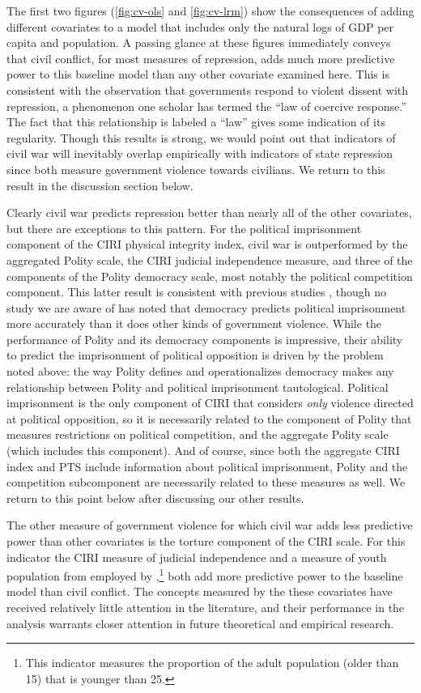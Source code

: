 \documentclass[12pt]{article}
\begin{document}
The first two figures (\ref{fig:cv-ols} and \ref{fig:cv-lrm}) show the consequences of adding different covariates to a model that includes only the natural logs of GDP per capita and population. A passing glance at these figures immediately conveys that civil conflict, for most measures of repression, adds much more predictive power to this baseline model than any other covariate examined here. This is consistent with the observation that governments respond to violent dissent with repression, a phenomenon one scholar \citep{Davenport2007AR} has termed the ``law of coercive response.'' The fact that this relationship is labeled a ``law'' gives some indication of its regularity. Though this results is strong, we would point out that indicators of civil war will inevitably overlap empirically with indicators of state repression since both measure government violence towards civilians. We return to this result in the discussion section below. 

Clearly civil war predicts repression better than nearly all of the other covariates, but there are exceptions to this pattern. For the political imprisonment component of the CIRI physical integrity index, civil war is outperformed by the aggregated Polity scale, the CIRI judicial independence measure, and three of the components of the Polity democracy scale, most notably the political competition component. This latter result is consistent with previous studies \citep{Keith2002PRQ,BDMetal2005}, though no study we are aware of has noted that democracy predicts political imprisonment more accurately than it does other kinds of government violence. While the performance of Polity and its democracy components is impressive, their ability to predict the imprisonment of political opposition is driven by the problem noted above: the way Polity defines and operationalizes democracy makes any relationship between Polity and political imprisonment tautological. Political imprisonment is the only component of CIRI that considers {\em only} violence directed at political opposition, so it is necessarily related to the component of Polity that measures restrictions on political competition, and the aggregate Polity scale (which includes this component). And of course, since both the aggregate CIRI index and PTS include information about political imprisonment, Polity and the competition subcomponent are necessarily related to these measures as well. We return to this point below after discussing our other results.

The other measure of government violence for which civil war adds less predictive power than other covariates is the torture component of the CIRI scale. For this indicator the CIRI measure of judicial independence and a measure of youth population from \citet{Urdal2006} employed by \citet{NordaasDavenport2013},\footnote{This indicator measures the proportion of the adult population (older than 15) that is younger than 25.} both add more predictive power to the baseline model than civil conflict. The concepts measured by the these covariates have received relatively little attention in the literature, and their performance in the analysis warrants closer attention in future theoretical and empirical research. 
\end{document}
